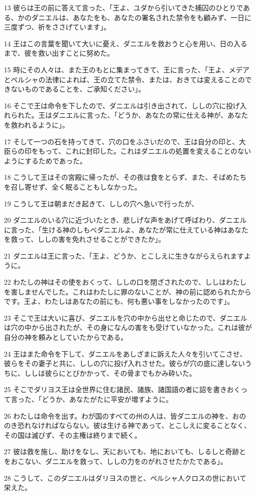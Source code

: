 \par 13 彼らは王の前に答えて言った、「王よ、ユダから引いてきた捕囚のひとりである、かのダニエルは、あなたをも、あなたの署名された禁令をも顧みず、一日に三度ずつ、祈をささげています」。
\par 14 王はこの言葉を聞いて大いに憂え、ダニエルを救おうと心を用い、日の入るまで、彼を救い出すことに努めた。
\par 15 時にその人々は、また王のもとに集まってきて、王に言った、「王よ、メデアとペルシャの法律によれば、王の立てた禁令、または、おきては変えることのできないものであることを、ご承知ください」。
\par 16 そこで王は命令を下したので、ダニエルは引き出されて、ししの穴に投げ入れられた。王はダニエルに言った、「どうか、あなたの常に仕える神が、あなたを救われるように」。
\par 17 そして一つの石を持ってきて、穴の口をふさいだので、王は自分の印と、大臣らの印をもって、これに封印した。これはダニエルの処置を変えることのないようにするためであった。
\par 18 こうして王はその宮殿に帰ったが、その夜は食をとらず、また、そばめたちを召し寄せず、全く眠ることもしなかった。
\par 19 こうして王は朝まだき起きて、ししの穴へ急いで行ったが、
\par 20 ダニエルのいる穴に近づいたとき、悲しげな声をあげて呼ばわり、ダニエルに言った、「生ける神のしもべダニエルよ、あなたが常に仕えている神はあなたを救って、ししの害を免れさせることができたか」。
\par 21 ダニエルは王に言った、「王よ、どうか、とこしえに生きながらえられますように。
\par 22 わたしの神はその使をおくって、ししの口を閉ざされたので、ししはわたしを害しませんでした。これはわたしに罪のないことが、神の前に認められたからです。王よ、わたしはあなたの前にも、何も悪い事をしなかったのです」。
\par 23 そこで王は大いに喜び、ダニエルを穴の中から出せと命じたので、ダニエルは穴の中から出されたが、その身になんの害をも受けていなかった。これは彼が自分の神を頼みとしていたからである。
\par 24 王はまた命令を下して、ダニエルをあしざまに訴えた人々を引いてこさせ、彼らをその妻子と共に、ししの穴に投げ入れさせた。彼らが穴の底に達しないうちに、ししは彼らにとびかかって、その骨までもかみ砕いた。
\par 25 そこでダリヨス王は全世界に住む諸民、諸族、諸国語の者に詔を書きおくって言った、「どうか、あなたがたに平安が増すように。
\par 26 わたしは命令を出す。わが国のすべての州の人は、皆ダニエルの神を、おののき恐れなければならない。彼は生ける神であって、とこしえに変ることなく、その国は滅びず、その主権は終りまで続く。
\par 27 彼は救を施し、助けをなし、天においても、地においても、しるしと奇跡とをおこない、ダニエルを救って、ししの力をのがれさせたかたである」。
\par 28 こうして、このダニエルはダリヨスの世と、ペルシャ人クロスの世において栄えた。

